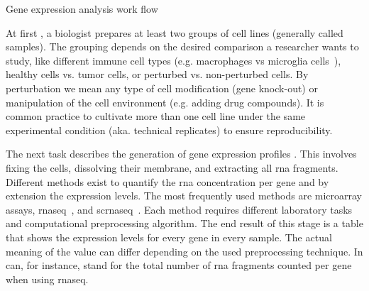 \documentclass{thesisclass}
\newcommand*\tikzCircled[1]{
	\node[shape=circle,draw,inner sep=2pt, fill=black] (char) {
		\textcolor{white}{#1}
	}
}
\newcommand*\circled[1]{
	\tikz[baseline=(char.base)]{
		\tikzCircled{#1};
	}
}
\begin{document}
\begin{centeredFigure}[!h]
{%
	}
		
	\caption{Gene expression analysis work flow}
	\label{fig:gene_expression_analysiss}
\end{centeredFigure}

At first \circled{1}, a biologist prepares at least two groups of cell lines (generally called samples). The grouping depends on the desired comparison a researcher wants to study, like different immune cell types (e.g. macrophages vs microglia cells~\cite{10.3389/fncel.2013.00045}), healthy cells vs. tumor cells, or perturbed vs. non-perturbed cells. By perturbation we mean any type of cell modification (gene knock-out) or manipulation of the cell environment (e.g. adding drug compounds). It is common practice to cultivate more than one cell line under the same experimental condition (aka. technical replicates) to ensure reproducibility.

The next task describes the generation of gene expression profiles \circled{2}. This involves fixing the cells,  dissolving their membrane, and extracting all \acrshort{rna} fragments. Different methods exist to quantify the \acrshort{rna} concentration per gene and by extension the expression levels. The most frequently used methods are microarray assays, \acrfull{rnaseq}~\cite{citeulike:691434}, and \acrfull{scrnaseq}~\cite{Eberwine2013}. Each method requires different laboratory tasks and computational preprocessing algorithm. The end result of this stage is a table that shows the expression levels for every gene in every sample. The actual meaning of the value can differ depending on the used preprocessing technique. In can, for instance, stand for the total number of \acrshort{rna} fragments counted per gene when using \acrshort{rnaseq}.
\end{document}
